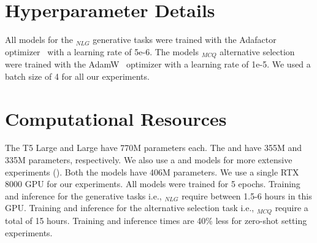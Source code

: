 \section{Hyperparameter Details}
All models for the \dataset{}$_{NLG}$ generative tasks were trained with the Adafactor optimizer~\cite{shazeer2018adafactor} with a learning rate of 5e-6. The models  \dataset{}$_{MCQ}$ alternative selection were trained with the AdamW~\cite{loshchilov2018decoupled} optimizer with a learning rate of 1e-5. We used a batch size of 4 for all our experiments.

\section{Computational Resources}
The T5 Large and  Large have 770M parameters each. The  and  have 355M and 335M parameters, respectively. We also use a  and  models for more extensive experiments (). Both the models have 406M parameters. We use a single RTX 8000 GPU for our experiments. All models were trained for 5 epochs. Training and inference for the generative tasks i.e., \dataset{}$_{NLG}$ require between 1.5-6 hours in this GPU. Training and inference for the alternative selection task i.e., \dataset{}$_{MCQ}$ require a total of 15 hours. Training and inference times are 40\% less for zero-shot setting experiments. 